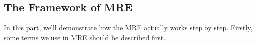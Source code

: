 \subsection{The Framework of MRE}\label{ModelFramework}

In this part, we'll demonstrate how the MRE actually works step by step. Firstly, some terms we use in MRE should be described first. 
 
